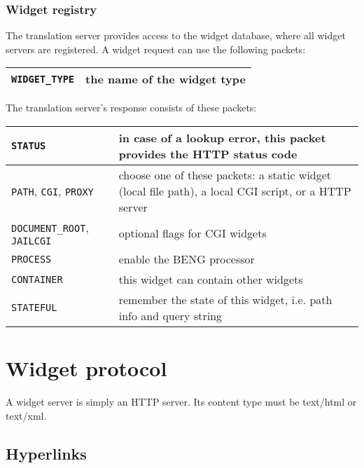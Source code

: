 \documentclass[a4paper,12pt]{article}
\begin{document}
\subsubsection{Widget registry}

The translation server provides access to the widget database, where
all widget servers are registered.  A widget request can use the
following packets:

\begin{tabular}{|l|p{10cm}|}
\hline
\texttt{WIDGET\_TYPE} & the name of the widget type \\
\hline
\end{tabular}

The translation server's response consists of these packets:

\begin{tabular}{|l|p{10cm}|}
\hline
\texttt{STATUS} & in case of a lookup error, this packet provides the
HTTP status code \\
\hline

\texttt{PATH}, \texttt{CGI}, \texttt{PROXY} & choose one of these
packets: a static widget (local file path), a local CGI script, or a
HTTP server \\

\hline

\texttt{DOCUMENT\_ROOT}, \texttt{JAILCGI} & optional flags for CGI
widgets \\

\hline
\texttt{PROCESS} & enable the BENG processor \\
\hline
\texttt{CONTAINER} & this widget can contain other widgets \\
\hline

\texttt{STATEFUL} & remember the state of this widget, i.e. path info
and query string \\

\hline
\end{tabular}


\section{Widget protocol}

A widget server is simply an HTTP server.  Its content type must be
text/html or text/xml.


\subsection{Hyperlinks}
\end{document}
